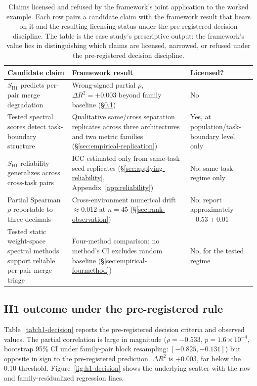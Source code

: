 \documentclass[10pt]{article}
\begin{document}
\begin{table}[h]
\centering
\small
\begin{tabular}{p{}p{}p{}}
\toprule
Candidate claim & Framework result & Licensed? \\
\midrule
$S_{\mathrm{H1}}$ predicts per-pair merge degradation
  & Wrong-signed partial $\rho$, $\Delta R^2 = +0.003$ beyond
    family baseline (\S\ref{sec:empirical-h1})
  & No \\
Tested spectral scores detect task-boundary structure
  & Qualitative same/cross separation replicates across three
    architectures and two metric families
    (\S\ref{sec:empirical-replication})
  & Yes, at population/task-boundary level only \\
$S_{\mathrm{H1}}$ reliability generalizes across cross-task pairs
  & ICC estimated only from same-task seed replicates
    (\S\ref{sec:applying-reliability},
    Appendix~\ref{app:reliability})
  & No; same-task regime only \\
Partial Spearman $\rho$ reportable to three decimals
  & Cross-environment numerical drift $\approx 0.012$ at $n=45$
    (\S\ref{sec:rank-observation})
  & No; report approximately $-0.53 \pm 0.01$ \\
Tested static weight-space spectral methods support reliable
  per-pair merge triage
  & Four-method comparison: no method's CI excludes random
    baseline (\S\ref{sec:empirical-fourmethod})
  & No, for the tested regime \\
\bottomrule
\end{tabular}
\caption{Claims licensed and refused by the framework's joint
  application to the worked example. Each row pairs a
  candidate claim with the framework result that bears on it
  and the resulting licensing status under the pre-registered
  decision discipline. The table is the case study's
  prescriptive output: the framework's value lies in
  distinguishing which claims are licensed, narrowed, or
  refused under the pre-registered decision discipline.}
\label{tab:claims-licensed-refused}
\end{table}

\subsection{H1 outcome under the pre-registered rule}
\label{sec:empirical-h1}

Table~\ref{tab:h1-decision} reports the pre-registered decision
criteria and observed values. The partial correlation is large in
magnitude ($\rho = -0.533$, $p = 1.6 \times 10^{-4}$, bootstrap 95\%
CI under family-pair block resampling: $[-0.825, -0.131]$) but
opposite in sign to the pre-registered prediction. $\Delta R^2$
is $+0.003$, far below the 0.10 threshold.
Figure~\ref{fig:h1-decision} shows the underlying scatter with the
raw and family-residualized regression lines.
\end{document}
